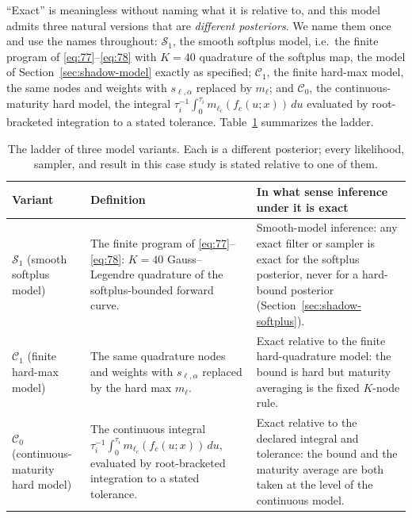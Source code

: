 \documentclass[11pt]{article}
\begin{document}
``Exact'' is meaningless without naming what it is relative
to, and this model admits three natural versions that are
\emph{different posteriors}. We name them once and use the names
throughout: \(\mathcal S_1\), the smooth softplus model, i.e.\ the finite
program of \eqref{eq:77}--\eqref{eq:78} with \(K=40\) quadrature of the
softplus map, the model of Section~\ref{sec:shadow-model} exactly as
specified; \(\mathcal C_1\), the finite hard-max model, the same
nodes and weights with \(s_{\ell,\alpha}\) replaced by \(m_\ell\); and
\(\mathcal C_0\), the continuous-maturity hard model, the integral
\(\tau_i^{-1}\int_0^{\tau_i} m_{\ell_c}(f_c(u;x))\,du\) evaluated by
root-bracketed integration to a stated tolerance. Table~\ref{tab:ladder}
summarizes the ladder.

\begin{table}[htbp]\small
\begin{tabularx}{\textwidth}{@{}>{\raggedright\arraybackslash}p{}XX@{}}
\toprule
Variant & Definition & In what sense inference under it is exact \\
\midrule
\(\mathcal S_1\) (smooth softplus model) &
The finite program of \eqref{eq:77}--\eqref{eq:78}: \(K=40\)
Gauss--Legendre quadrature of the softplus-bounded forward curve. &
Smooth-model inference: any exact filter or sampler is exact for the
softplus posterior, never for a hard-bound posterior
(Section~\ref{sec:shadow-softplus}). \\
\(\mathcal C_1\) (finite hard-max model) &
The same quadrature nodes and weights with \(s_{\ell,\alpha}\)
replaced by the hard max \(m_\ell\). &
Exact relative to the finite hard-quadrature model: the bound is hard
but maturity averaging is the fixed \(K\)-node rule. \\
\(\mathcal C_0\) (continuous-maturity hard model) &
The continuous integral
\(\tau_i^{-1}\int_0^{\tau_i} m_{\ell_c}(f_c(u;x))\,du\), evaluated by
root-bracketed integration to a stated tolerance. &
Exact relative to the declared integral and tolerance: the bound and
the maturity average are both taken at the level of the continuous
model. \\
\bottomrule
\end{tabularx}
\caption{The ladder of three model variants. Each is a different
posterior; every likelihood, sampler, and result in this case study is
stated relative to one of them.}\label{tab:ladder}
\end{table}
\end{document}
